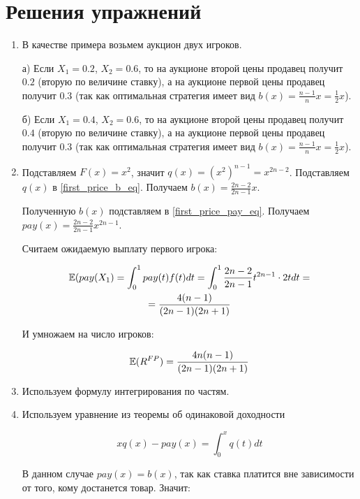 \section{Решения упражнений}

\begin{enumerate}
\item В качестве примера возьмем аукцион двух игроков.

а) Если $ X_{1}=0.2 $, $ X_{2}=0.6 $, то на аукционе второй цены продавец получит $ 0.2 $ (вторую по величине ставку), а на аукционе первой цены продавец получит $ 0.3 $ (так как оптимальная стратегия имеет вид $ b(x)=\frac{n-1}{n}x=\frac{1}{2}x $).

б) Если $ X_{1}=0.4 $, $ X_{2}=0.6 $, то на аукционе второй цены продавец получит $ 0.4 $ (вторую по величине ставку), а на аукционе первой цены продавец получит $ 0.3 $ (так как оптимальная стратегия имеет вид $ b(x)=\frac{n-1}{n}x=\frac{1}{2}x $).

\item Подставляем $ F(x)=x^{2} $, значит $ q(x)=(x^{2})^{n-1}=x^{2n-2} $. Подставляем $ q(x) $ в \ref{first_price_b_eq}. Получаем $ b(x)=\frac{2n-2}{2n-1}x $.

Полученную $ b(x) $ подставляем в \ref{first_price_pay_eq}. Получаем $ pay(x)=\frac{2n-2}{2n-1}x^{2n-1} $.

Считаем ожидаемую выплату первого игрока:

\begin{multline}
\mathbb{E}(pay(X_{1})=\int_{0}^{1}pay(t)f(t)dt=\int_{0}^{1}\frac{2n-2}{2n-1}t^{2n-1}\cdot 2tdt=\\
=\frac{4(n-1)}{(2n-1)(2n+1)}
\end{multline}

И умножаем на число игроков:

\begin{equation}
\mathbb{E}(R^{FP})=\frac{4n(n-1)}{(2n-1)(2n+1)}
\end{equation}

\item Используем формулу интегрирования по частям.


\item Используем уравнение из теоремы об одинаковой доходности

\begin{equation}
xq(x)-pay(x)=\int_{0}^{x}q(t)dt
\end{equation}

В данном случае $ pay(x)=b(x) $, так как ставка платится вне зависимости от того, кому достанется товар. Значит:


\end{enumerate}
